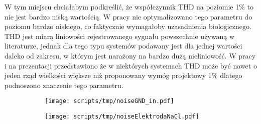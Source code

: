 \begin{frame}[t]
\begin{block}{\dk}
\end{block}

W tym miejscu chciałabym podkreślić, że współczynnik THD na poziomie 1\% to nie jest bardzo niską wartością. W pracy nie optymalizowano tego parametru do poziomu bardzo niskiego, co faktycznie wymagałoby uzasadnienia biologicznego. THD jest miarą liniowości rejestrowanego sygnału powszechnie używaną w literaturze, jednak dla tego typu systemów podawany jest dla jednej wartości daleko od zakresu, w którym jest narażony na bardzo dużą nieliniowość. W pracy i na prezentacji przedstawiono że w niektórych systemach THD może być nawet o jeden rząd wielkości większe niż proponowany wymóg projektowy 1\% dlatego podnoszono znaczenie tego parametru.


\end{frame}






\begin{frame}[t]
    \begin{block}{\dk}
    \end{block}
    \begin{figure}[H]
        \centering
        \begin{subfigure}[b]{0.485\textwidth}
            \centering
            \texttt{[image: scripts/tmp/noiseGND\_in.pdf]}
        \end{subfigure}
        \begin{subfigure}[b]{0.485\textwidth}
            \centering
            \texttt{[image: scripts/tmp/noiseElektrodaNaCl.pdf]}
        \end{subfigure}     
    \end{figure}
\end{frame}

